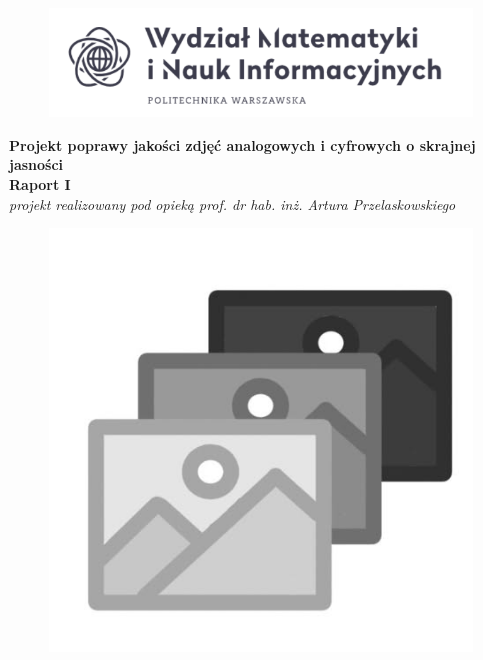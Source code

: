 \documentclass[options]{mwart}
\begin{document}
\thispagestyle{empty}

\begin{figure}[h]
    \centering
    \includegraphics[width=1\textwidth]{logo_uczelni.png}
\end{figure}


\begin{center}
    {\LARGE \textbf{Projekt poprawy jakości zdjęć analogowych i cyfrowych o skrajnej jasności}} \\[0.3cm]
    {\large \textbf{Raport I}} \\[0.2cm]
    \textit{projekt realizowany pod opieką prof. dr hab. inż. Artura Przelaskowskiego}

\end{center}

\begin{figure}[h]
    \centering
    \includegraphics[width=1\textwidth]{logo_projektu.png}
\end{figure}
\end{document}
